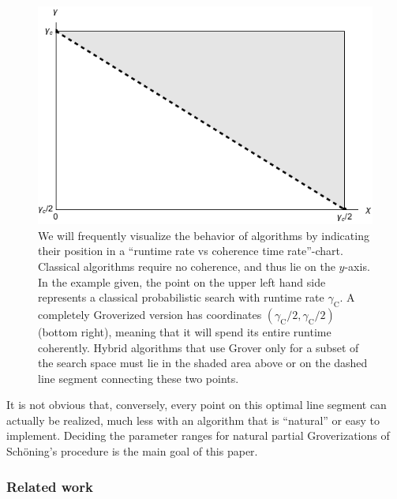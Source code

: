 \documentclass[a4paper,aps,floatfix]{revtex4}
\begin{document}
\begin{figure}[ht]
    \begin{center}
			\includegraphics[scale=.65]{images/chart}
    \end{center}
		\caption{\label{fig:chart} 
			We will frequently visualize the behavior of algorithms by indicating their position in a ``runtime rate vs coherence time rate''-chart.
			Classical algorithms require no coherence, and thus lie on the $y$-axis.
			In the example given, the point on the upper left hand side represents a classical probabilistic search with runtime rate $\gamma_{\mathrm{C}}$.
			A completely Groverized version has coordinates $( \gamma_{\mathrm{C}}/2, \gamma_{\mathrm{C}}/2)$ (bottom right), meaning that it will spend its entire runtime coherently.
			Hybrid algorithms that use Grover only for a subset of the search space must lie in the shaded area above or on the dashed line segment connecting these two points.
		}
\end{figure}

It is not obvious that, conversely, every point on this optimal line segment can actually be realized, much less with an algorithm that is ``natural'' or easy to implement.
Deciding the parameter ranges for natural partial Groverizations of Sch\"oning's procedure is the main goal of this paper.



\subsubsection{Related work}
\end{document}
